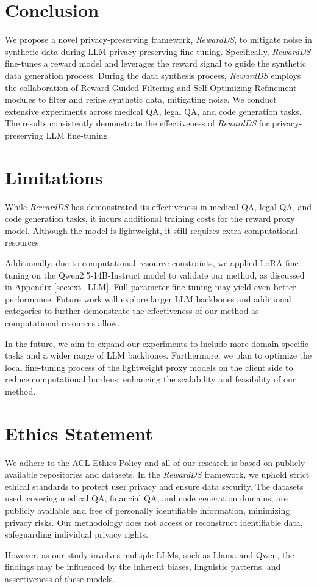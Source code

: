 \section{Conclusion}
We propose a novel privacy-preserving framework, \textit{RewardDS}, to mitigate noise in synthetic data during LLM privacy-preserving fine-tuning. 
Specifically, \textit{RewardDS} fine-tunes a reward model and leverages the reward signal to guide the synthetic data generation process. 
During the data synthesis process, \textit{RewardDS} employs the collaboration of Reward Guided Filtering and Self-Optimizing Refinement modules to filter and refine synthetic data, mitigating noise. 
We conduct extensive experiments across medical QA, legal QA, and code generation tasks. 
The results consistently demonstrate the effectiveness of \textit{RewardDS} for privacy-preserving LLM fine-tuning.

\section*{Limitations}
While \textit{RewardDS} has demonstrated its effectiveness in medical QA, legal QA, and code generation tasks, it incurs additional training costs for the reward proxy model. 
Although the model is lightweight, it still requires extra computational resources.

Additionally, due to computational resource constraints, we applied LoRA fine-tuning on the Qwen2.5-14B-Instruct model to validate our method, as discussed in Appendix \ref{sec:ext_LLM}. 
Full-parameter fine-tuning may yield even better performance. Future work will explore larger LLM backbones and additional categories to further demonstrate the effectiveness of our method as computational resources allow.

In the future, we aim to expand our experiments to include more domain-specific tasks and a wider range of LLM backbones. Furthermore, we plan to optimize the local fine-tuning process of the lightweight proxy models on the client side to reduce computational burdens, enhancing the scalability and feasibility of our method.


\section{Ethics Statement}
We adhere to the ACL Ethics Policy and all of our research is based on publicly available repositories and datasets. 
In the \textit{RewardDS} framework, we uphold strict ethical standards to protect user privacy and ensure data security. 
The datasets used, covering medical QA, financial QA, and code generation domains, are publicly available and free of personally identifiable information, minimizing privacy risks.
Our methodology does not access or reconstruct identifiable data, safeguarding individual privacy rights.

However, as our study involves multiple LLMs, such as Llama and Qwen, the findings may be influenced by the inherent biases, linguistic patterns, and assertiveness of these models.